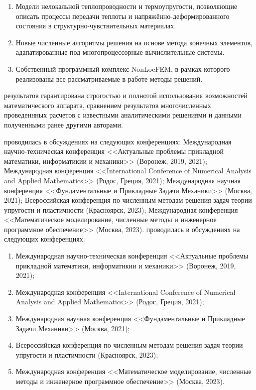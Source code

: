 {}
\begin{enumerate}[beginpenalty=10000] %
 	\item Модели нелокальной теплопроводности и термоупругости, позволяющие описать процессы передачи теплоты и напряжённо-деформированного состояния в структурно-чувствительных материалах.
	\item Новые численные алгоритмы решения на основе метода конечных элементов, адапатированные под многопроцессорные вычислительные системы.
	\item Собственный программный комплекс NonLocFEM, в рамках которого реализованы все рассматриваемые в работе методы решений.
\end{enumerate}


{\reliability} результатов гарантирована строгостью и полнотой использования возможностей математического аппарата, сравнением результатов многочисленных проведеннных расчетов с известными аналитическими решениями и данными полученными ранее другими авторами.

\ifsynopsis
{\probation} проводилась в обсуждениях на следующих конференциях:
Международная научно-техническая конференция <<Актуальные проблемы прикладной математики, информатикии и механики>> (Воронеж, 2019, 2021); Международная конференция <<International Conference of Numerical Analysis and Applied Mathematics>> (Родос, Греция, 2021); Международная научная конференция <<Фундаментальные и Прикладные Задачи Механики>> (Москва, 2021); Всероссийская конференция по численным методам решения задач теории упругости и пластичности (Красноярск, 2023); Международная конференция <<Математическое моделирование, численные методы и инженерное программное обеспечение>> (Москва, 2023).
\else
{\probation} проводилась в обсуждениях на следующих конференциях:
\begin{enumerate}
	\item Международная научно-техническая конференция <<Актуальные проблемы прикладной математики, информатикии и механики>> (Воронеж, 2019, 2021);
	\item Международная конференция <<International Conference of Numerical Analysis and Applied Mathematics>> (Родос, Греция, 2021);
	\item Международная научная конференция <<Фундаментальные и Прикладные Задачи Механики>> (Москва, 2021);
	\item Всероссийская конференция по численным методам решения задач теории упругости и пластичности (Красноярск, 2023);
	\item Международная конференция <<Математическое моделирование, численные методы и инженерное программное обеспечение>> (Москва, 2023).
\end{enumerate}
\fi

